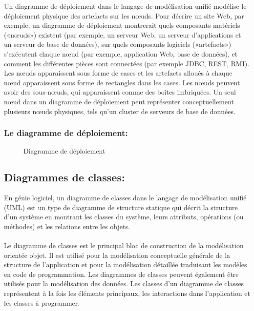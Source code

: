 \documentclass[12pt]{report}
\begin{document}
Un diagramme de déploiement dans le langage de modélisation unifié modélise le déploiement physique des artefacts sur les nœuds. Pour décrire un site Web, par exemple, un diagramme de déploiement montrerait quels composants matériels («nœuds») existent (par exemple, un serveur Web, un serveur d’applications et un serveur de base de données), sur quels composants logiciels («artefacts») s’exécutent chaque nœud (par exemple, application Web, base de données), et comment les différentes pièces sont connectées (par exemple JDBC, REST, RMI).
\\
Les nœuds apparaissent sous forme de cases et les artefacts alloués à chaque nœud apparaissent sous forme de rectangles dans les cases. Les nœuds peuvent avoir des sous-nœuds, qui apparaissent comme des boîtes imbriquées. Un seul nœud dans un diagramme de déploiement peut représenter conceptuellement plusieurs nœuds physiques, tels qu'un cluster de serveurs de base de données.

\vspace{0.2in}

\subsubsection{Le diagramme de déploiement:}

\vspace{0.2in}

\begin{figure}[h]
\centering
    \caption{Diagramme de déploiement}
\end{figure}

\newpage

\subsection{Diagrammes de classes:}

En génie logiciel, un diagramme de classes dans le langage de modélisation unifié (UML) est un type de diagramme de structure statique qui décrit la structure d'un système en montrant les classes du système, leurs attributs, opérations (ou méthodes) et les relations entre les objets.
\\\\
Le diagramme de classes est le principal bloc de construction de la modélisation orientée objet. Il est utilisé pour la modélisation conceptuelle générale de la structure de l'application et pour la modélisation détaillée traduisant les modèles en code de programmation. Les diagrammes de classes peuvent également être utilisés pour la modélisation des données. Les classes d'un diagramme de classes représentent à la fois les éléments principaux, les interactions dans l'application et les classes à programmer.
\end{document}
